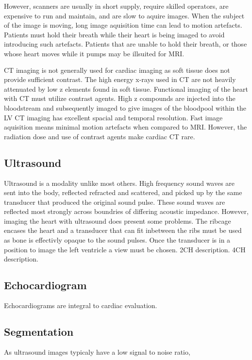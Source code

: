 \documentclass{article}
\begin{document}
However, scanners are usually in short supply, require skilled operators, are expensive to run and maintain, and are slow to aquire images.
When the subject of the image is moving, long image aquisition time can lead to motion artefacts.
Patients must hold their breath while their heart is being imaged to avoid introducing such artefacts.
Patients that are unable to hold their breath, or those whose heart moves while it pumps may be illsuited for MRI.

CT imaging is not generally used for cardiac imaging as soft tissue does not provide sufficient contrast.
The high energy x-rays used in CT are not heavily attenuated by low z elements found in soft tissue.
Functional imaging of the heart with CT must utilize contrast agents\cite{ef_soa}.
High z compounds are injected into the bloodstream and subsequently imaged to give images of the bloodpool within the LV
CT imaging has excellent spacial and temporal resolution. 
Fast image aquisition means minimal motion artefacts when compared to MRI.
However, the radiation dose and use of contrast agents make cardiac CT rare.


\subsection{Ultrasound}

Ultrasound is a modality unlike most others. 
High frequency sound waves are sent into the body, reflected refracted and scattered, and picked up by the same transducer that produced the original sound pulse. 
These sound waves are reflected most strongly across boundries of differing acoustic impedance.
However, imaging the heart with ultrasound does present some problems.
The ribcage encases the heart and a transducer that can fit inbetween the ribs must be used as bone is effectivly opaque to the sound pulses. 
Once the transducer is in a position to image the left ventricle a view must be chosen. 
2CH description.
4CH description. 
\subsection{Echocardiogram}
Echocardiograms are integral to cardiac evaluation.
\subsection{Segmentation}
As ultrasound images typicaly have a low signal to noise ratio,
\end{document}

